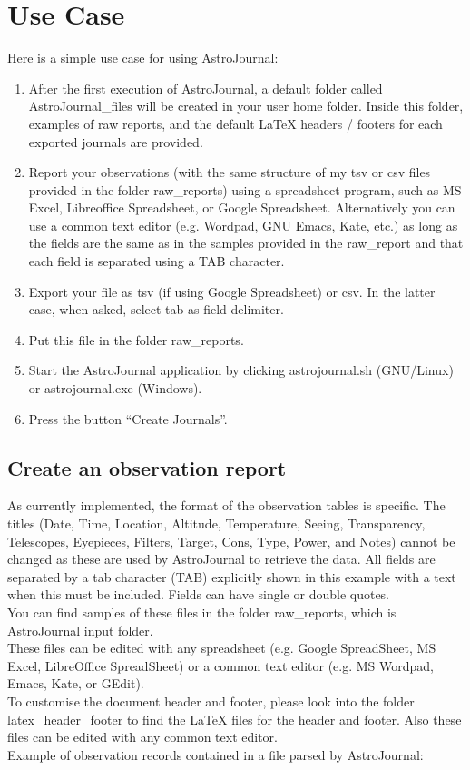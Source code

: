 \section{Use Case}
\label{sec:Use Case}
Here is a simple use case for using AstroJournal:\\
\begin{enumerate}
 \item After the first execution of AstroJournal, a default folder called AstroJournal\_files will be created in your user home folder. Inside this folder, examples of raw reports, and the default LaTeX headers / footers for each exported journals are provided. 
 \item Report your observations (with the same structure of my tsv or csv files provided in the folder raw\_reports) using a spreadsheet program, such as MS Excel, Libreoffice Spreadsheet, or Google Spreadsheet. Alternatively you can use a common text editor (e.g. Wordpad, GNU Emacs, Kate, etc.) as long as the fields are the same as in the samples provided in the raw\_report and that each field is separated using a TAB character.
 \item Export your file as tsv (if using Google Spreadsheet) or csv. In the latter case, when asked, select tab as field delimiter.
 \item Put this file in the folder raw\_reports.
 \item Start the AstroJournal application by clicking astrojournal.sh (GNU/Linux) or astrojournal.exe (Windows).
 \item Press the button ``Create Journals''.
\end{enumerate}



\subsection{Create an observation report}
\label{sec:Create an observation report}
As currently implemented, the format of the observation tables is specific. The titles (Date, Time, Location, Altitude, Temperature, Seeing, Transparency, Telescopes, Eyepieces, Filters, Target, Cons, Type, Power, and Notes) cannot be changed as these are used by AstroJournal to retrieve the data. All fields are separated by a tab character (TAB) explicitly shown in this example with a text when this must be included. Fields can have single or double quotes.\\
You can find samples of these files in the folder raw\_reports, which is 
AstroJournal input folder.\\
These files can be edited with any spreadsheet (e.g. Google SpreadSheet, MS Excel, LibreOffice SpreadSheet) or a common text editor (e.g. MS Wordpad, Emacs, Kate, or GEdit).\\
To customise the document header and footer, please look into the folder 
latex\_header\_footer to find the LaTeX files for the header and footer. Also these files can be edited with any common text editor.\\
Example of observation records contained in a file parsed by AstroJournal:\\

